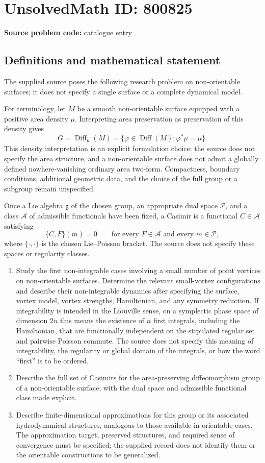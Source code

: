 \documentclass[11pt]{article}
\begin{document}
\section*{UnsolvedMath ID: 800825}
\textbf{Source problem code:} catalogue entry
\subsection{Definitions and mathematical statement}
The supplied source poses the following research problem on non-orientable surfaces; it does not specify a single surface or a complete dynamical model.

For terminology, let \(M\) be a smooth non-orientable surface equipped with a positive area density \(\mu\). Interpreting area preservation as preservation of this density gives
\[
G=\operatorname{Diff}_{\mu}(M)=\{\varphi\in\operatorname{Diff}(M):\varphi^*\mu=\mu\}.
\]
This density interpretation is an explicit formulation choice: the source does not specify the area structure, and a non-orientable surface does not admit a globally defined nowhere-vanishing ordinary area two-form. Compactness, boundary conditions, additional geometric data, and the choice of the full group or a subgroup remain unspecified.

Once a Lie algebra \(\mathfrak g\) of the chosen group, an appropriate dual space \(\mathcal P\), and a class \(\mathcal A\) of admissible functionals have been fixed, a Casimir is a functional \(C\in\mathcal A\) satisfying
\[
\{C,F\}(m)=0
\qquad\text{for every }F\in\mathcal A\text{ and every }m\in\mathcal P,
\]
where \(\{\cdot,\cdot\}\) is the chosen Lie--Poisson bracket. The source does not specify these spaces or regularity classes.

\begin{enumerate}
\item Study the first non-integrable cases involving a small number of point vortices on non-orientable surfaces. Determine the relevant small-vortex configurations and describe their non-integrable dynamics after specifying the surface, vortex model, vortex strengths, Hamiltonian, and any symmetry reduction. If integrability is intended in the Liouville sense, on a symplectic phase space of dimension \(2n\) this means the existence of \(n\) first integrals, including the Hamiltonian, that are functionally independent on the stipulated regular set and pairwise Poisson commute. The source does not specify this meaning of integrability, the regularity or global domain of the integrals, or how the word ``first'' is to be ordered.
\item Describe the full set of Casimirs for the area-preserving diffeomorphism group of a non-orientable surface, with the dual space and admissible functional class made explicit.
\item Describe finite-dimensional approximations for this group or its associated hydrodynamical structures, analogous to those available in orientable cases. The approximation target, preserved structures, and required sense of convergence must be specified; the supplied record does not identify them or the orientable constructions to be generalized.
\end{enumerate}
\end{document}
